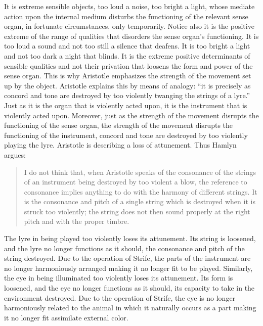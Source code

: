 It is extreme sensible objects, too loud a noise, too bright a light, whose mediate action upon the internal medium disturbs the functioning of the relevant sense organ, in fortunate circumstances, only temporarily. Notice also it is the positive extreme of the range of qualities that disorders the sense organ's functioning. It is too loud a sound and not too still a silence that deafens. It is too bright a light and not too dark a night that blinds. It is the extreme positive determinants of sensible qualities and not their privation that loosens the form and power of the sense organ. This is why Aristotle emphasizes the strength of the movement set up by the object. Aristotle explains this by means of analogy: ``it is precisely as concord and tone are destroyed by too violently twanging the strings of a lyre.'' Just as it is the organ that is violently acted upon, it is the instrument that is violently acted upon. Moreover, just as the strength of the movement disrupts the functioning of the sense organ, the strength of the movement disrupts the functioning of the instrument, concord and tone are destroyed by too violently playing the lyre. Aristotle is describing a loss of attunement. Thus Hamlyn argues:
\begin{quote}
	I do not think that, when Aristotle speaks of the consonance of the strings of an instrument being destroyed by too violent a blow, the reference to consonance implies anything to do with the harmony of different strings. It is the consonance and pitch of a single string which is destroyed when it is struck too violently; the string does not then sound properly at the right pitch and with the proper timbre. \citep[114]{Hamlyn:2002ys}
\end{quote}
The lyre in being played too violently loses its attunement. Its string is loosened, and the lyre no longer functions as it should, the consonance and pitch of the string destroyed. Due to the operation of Strife, the parts of the instrument are no longer harmoniously arranged making it no longer fit to be played. Similarly, the eye in being illuminated too violently loses its attunement. Its form is loosened, and the eye no longer functions as it should, its capacity to take in the environment destroyed. Due to the operation of Strife, the eye is no longer harmoniously related to the animal in which it naturally occurs as a part making it no longer fit assimilate external color. 

